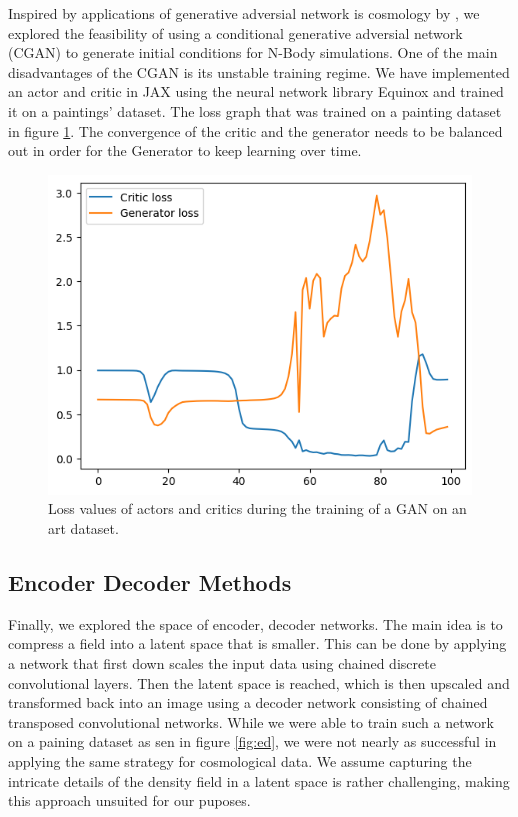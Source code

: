\documentclass{article}
\begin{document}
{\begin{appendices}
Inspired by applications of generative adversial network is cosmology by \cite{bernardini2022ember}, we explored the feasibility of using a conditional generative adversial network (CGAN) \citep{gauthier2014conditional} to generate initial conditions for N-Body simulations. One of the main disadvantages of the CGAN is its unstable training regime. We have implemented an actor and critic in {JAX} \citep{jax2018github} using the neural network library {Equinox} \citep{kidger2021equinox} and trained it on a paintings' dataset. The loss graph that was trained on a painting dataset in figure \ref{fig:gan}. The convergence of the critic and the generator needs to be balanced out in order for the Generator to keep learning over time. 

\begin{figure}[h]
    \centering
    \includegraphics[width=0.5\linewidth]{img/gan.png}
    \caption{Loss values of actors and critics during the training of a GAN on an art dataset.}
    \label{fig:gan}
\end{figure}

\subsection{Encoder Decoder Methods}
\label{encoder-decoder}

Finally, we explored the space of encoder, decoder networks. The main idea is to compress a field into a latent space that is smaller. This can be done by applying a network that first down scales the input data using chained discrete convolutional layers. Then the latent space is reached, which is then upscaled and transformed back into an image using a decoder network consisting of chained transposed convolutional networks. While we were able to train such a network on a paining dataset as sen in figure \ref{fig:ed}, we were not nearly as successful in applying the same strategy for cosmological data. We assume capturing the intricate details of the density field in a latent space is rather challenging, making this approach unsuited for our puposes.


\end{appendices}}
\end{document}
